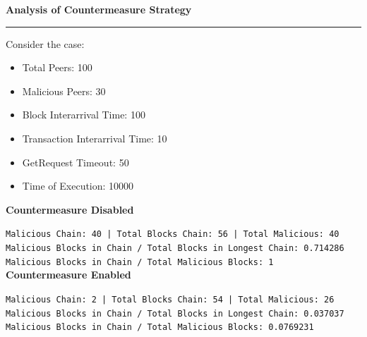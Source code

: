 \documentclass[a4paper,12pt]{article}
\newenvironment{solution}[2][]{%
\begin{mdframed}[linecolor=blue!70!black, linewidth=2pt, roundcorner=10pt, backgroundcolor=yellow!10!white, skipabove=12pt, skipbelow=12pt]%
	\textbf{\large #2}
	\par\noindent\rule{\textwidth}{0.4pt}
}{
\end{mdframed}
}
\begin{document}
\begin{solution}{Analysis of Countermeasure Strategy}
Consider the case:
\begin{itemize}
	\vspace{-7pt}
	\item Total Peers: 100
	\vspace{-7pt}
	\item Malicious Peers: 30
	\vspace{-7pt}
	\item Block Interarrival Time: 100
	\vspace{-7pt}
	\item Transaction Interarrival Time: 10
	\vspace{-7pt}
	\item GetRequest Timeout: 50 
	\vspace{-7pt}
	\item Time of Execution: 10000
\end{itemize}



\textbf{Countermeasure Disabled}
\begin{figure}[H]
\centering
{} 

\end{figure}
\vspace{-15pt}
\texttt{Malicious Chain: 40 | Total Blocks Chain: 56 | Total Malicious: 40\\
Malicious Blocks in Chain / Total Blocks in Longest Chain: 0.714286\\
Malicious Blocks in Chain / Total Malicious Blocks: 1}\\
\textbf{Countermeasure Enabled}
\vspace{0pt}
\begin{figure}[H]
\centering
{} 

\end{figure}
\vspace{-15pt}
\texttt{Malicious Chain: 2 | Total Blocks Chain: 54 | Total Malicious: 26\\
Malicious Blocks in Chain / Total Blocks in Longest Chain: 0.037037\\
Malicious Blocks in Chain / Total Malicious Blocks: 0.0769231}\\


\end{solution}
\end{document}
